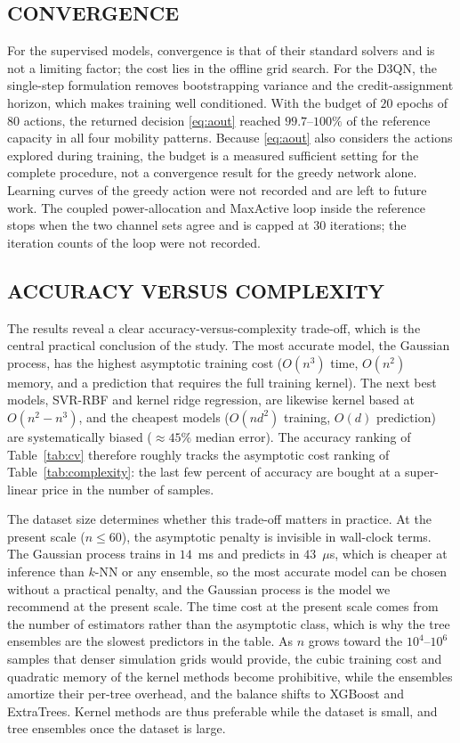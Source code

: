 \documentclass{ieee-ojvt}
\begin{document}
\subsection{CONVERGENCE}
For the supervised models, convergence is that of their standard solvers and is not a
limiting factor; the cost lies in the offline grid search. For the D3QN, the single-step
formulation removes bootstrapping variance and the credit-assignment horizon, which makes
training well conditioned. With the budget of $20$ epochs of $80$ actions, the returned
decision \eqref{eq:aout} reached $99.7$--$100\%$ of the reference capacity in all four
mobility patterns. Because \eqref{eq:aout} also considers the actions explored during
training, the budget is a measured sufficient setting for the complete procedure, not a
convergence result for the greedy network alone. Learning curves of the greedy action
were not recorded and are left to future work. The coupled power-allocation and MaxActive
loop inside the reference stops when the two channel sets agree and is capped at $30$
iterations; the iteration counts of the loop were not recorded.

\subsection{ACCURACY VERSUS COMPLEXITY}
The results reveal a clear accuracy-versus-complexity trade-off, which is the central
practical conclusion of the study. The most accurate model, the Gaussian process, has the
highest asymptotic training cost ($O(n^3)$ time, $O(n^2)$ memory, and a prediction that
requires the full training kernel). The next best models, SVR-RBF and kernel ridge
regression, are likewise kernel based at $O(n^2\!-\!n^3)$, and the cheapest models
($O(nd^2)$ training, $O(d)$ prediction) are systematically biased ($\approx45\%$ median
error). The accuracy ranking of Table~\ref{tab:cv} therefore roughly tracks the
asymptotic cost ranking of Table~\ref{tab:complexity}: the last few percent of accuracy
are bought at a super-linear price in the number of samples.

The dataset size determines whether this trade-off matters in practice. At the present
scale ($n\le60$), the asymptotic penalty is invisible in wall-clock terms. The Gaussian process trains in
$14$~ms and predicts in $43$~$\mu$s, which is cheaper at inference than $k$-NN or any
ensemble, so the most accurate model can be chosen without a practical penalty, and the
Gaussian process is the model we recommend at the present scale. The time cost at the
present scale comes from the number of estimators rather than the asymptotic class,
which is why the tree ensembles are the slowest predictors in the table. As $n$ grows
toward the $10^4$--$10^6$ samples that denser simulation grids would provide, the cubic
training cost and quadratic memory of the kernel methods become prohibitive, while the
ensembles amortize their per-tree overhead, and the balance shifts to XGBoost and
ExtraTrees. Kernel methods are thus preferable while the dataset is small, and tree
ensembles once the dataset is large.
\end{document}
